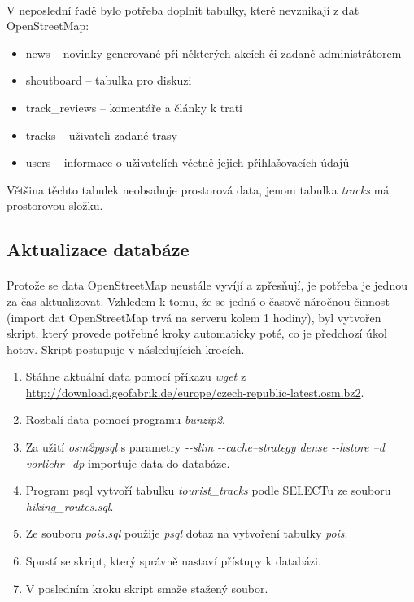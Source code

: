 \documentclass[11pt,a4paper,titlepage,oneside]{book}
\begin{document}
				\paragraph{} V neposlední řadě bylo potřeba doplnit tabulky, které nevznikají z dat OpenStreetMap:
					\begin{itemize}
						\item news -- novinky generované při některých akcích či zadané administrátorem
						\item  shoutboard -- tabulka pro diskuzi
						\item  track\_reviews -- komentáře a články k trati
						\item  tracks -- uživateli zadané trasy
						\item users -- informace o uživatelích včetně jejich přihlašovacích údajů
					\end{itemize}
Většina těchto tabulek neobsahuje prostorová data, jenom tabulka \textit{tracks} má prostorovou složku.
			\subsection{Aktualizace databáze}
				\paragraph{} Protože se data OpenStreetMap neustále vyvíjí a zpřesňují, je potřeba je jednou za čas aktualizovat. Vzhledem k tomu, že se jedná o časově náročnou činnost (import dat OpenStreetMap trvá na serveru kolem 1 hodiny), byl vytvořen skript, který provede potřebné kroky automaticky poté, co je předchozí úkol hotov. Skript postupuje v následujících krocích.
		\begin{enumerate}
			\item Stáhne aktuální data pomocí příkazu \textit{wget}  z \url{http://download.geofabrik.de/europe/czech-republic-latest.osm.bz2}.
			\item Rozbalí data pomocí programu \textit{bunzip2}.
			\item Za užití \textit{osm2pgsql} s parametry \textit{ -\--slim  -\--cache--strategy dense -\--hstore --d vorlichr\_dp} importuje data do databáze.
			\item Program psql vytvoří tabulku \textit{tourist\_tracks} podle SELECTu ze souboru \textit{hiking\_routes.sql}.
			\item Ze souboru \textit{pois.sql} použije \textit{psql} dotaz na vytvoření tabulky \textit{pois}.
			\item Spustí se skript, který správně nastaví přístupy k databázi.
			\item V posledním kroku skript smaže stažený soubor.
		\end{enumerate}
\end{document}
